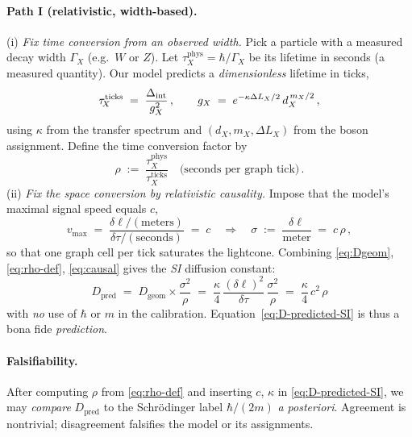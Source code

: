 \documentclass[11pt]{article}
\theoremstyle{plain}
\theoremstyle{definition}
\begin{document}
\paragraph{Path I (relativistic, width-based).}
(i) \emph{Fix time conversion from an observed width.}
Pick a particle with a measured decay width $\Gamma_{\!X}$ (e.g.\ $W$ or $Z$).
Let $\tau^{\mathrm{phys}}_{\!X} = \hbar/\Gamma_{\!X}$ be its lifetime in seconds (a measured quantity).
Our model predicts a \emph{dimensionless} lifetime in ticks,
\[
  \tau^{\mathrm{ticks}}_{\!X} \;=\; \frac{\Delta_{\rm int}}{g_X^2}\,,
  \qquad g_X \;=\; e^{-\kappa \Delta L_X/2}\, d_X^{\,m_X/2}\,,
\]
using $\kappa$ from the transfer spectrum and $(d_X,m_X,\Delta L_X)$ from the boson assignment.
Define the time conversion factor by
\begin{equation}\label{eq:rho-def}
  \rho \;:=\; \frac{\tau^{\mathrm{phys}}_{\!X}}{\tau^{\mathrm{ticks}}_{\!X}}
  \quad\text{(seconds per graph tick)}\, .
\end{equation}
(ii) \emph{Fix the space conversion by relativistic causality.}
Impose that the model’s maximal signal speed equals $c$,
\begin{equation}\label{eq:causal}
  v_{\max}\;=\;\frac{\delta\ell/\mathrm{(meters)}}{\delta\tau/\mathrm{(seconds)}} \;=\; c
  \quad\Longrightarrow\quad
  \sigma \;:=\; \frac{\delta\ell}{\mathrm{meter}} \;=\; c\,\rho \, ,
\end{equation}
so that one graph cell per tick saturates the lightcone.  Combining \eqref{eq:Dgeom}, \eqref{eq:rho-def}, \eqref{eq:causal} gives the \emph{SI} diffusion constant:
\begin{equation}\label{eq:D-predicted-SI}
  \boxed{\quad D_{\mathrm{pred}} \;=\; D_{\mathrm{geom}}\times \frac{\sigma^2}{\rho}
    \;=\; \frac{\kappa}{4}\,\frac{(\delta\ell)^2}{\delta\tau}\,\frac{\sigma^2}{\rho}
  \;=\; \frac{\kappa}{4}\,c^2\,\rho \quad}
\end{equation}
with \emph{no} use of $\hbar$ or $m$ in the calibration.  Equation~\eqref{eq:D-predicted-SI} is thus a bona fide \emph{prediction}.

\paragraph{Falsifiability.}
After computing $\rho$ from \eqref{eq:rho-def} and inserting $c$, $\kappa$ in \eqref{eq:D-predicted-SI},
we may \emph{compare} $D_{\mathrm{pred}}$ to the Schr\"odinger label $\hbar/(2m)$ \emph{a posteriori}.
Agreement is nontrivial; disagreement falsifies the model or its assignments.
\end{document}
